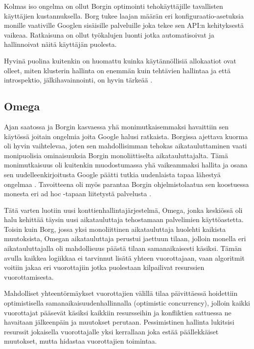 \documentclass[finnish]{tktltiki2}
\theoremstyle{definition}
\theoremstyle{remark}
\begin{document}
Kolmas iso ongelma on ollut Borgin optimointi tehokäyttäjille tavallisten käyttäjien kustannuksella. Borg tukee laajan määrän eri konfiguraatio-asetuksia monille vaativille Googlen sisäisille palveluille joka tekee sen API:n kehityksestä vaikeaa. Ratkaisuna on ollut työkalujen luonti jotka automatisoivat ja hallinnoivat näitä käyttäjän puolesta.

Hyvinä puolina kuitenkin on huomattu kuinka käytännöllisiä allokaatiot ovat olleet, miten klusterin hallinta on enemmän kuin tehtävien hallintaa ja että introspektio, jälkihavainnointi, on hyvin tärkeää \cite{management-with-borg}.

\subsection{Omega}

Ajan saatossa ja Borgin kasvaessa yhä monimutkaisemmaksi havaittiin sen käytössä joitain ongelmia joita Google halusi ratkaista. Borgissa ajettava kuorma oli hyvin vaihtelevaa, joten sen mahdollisimman tehokas aikatauluttaminen vaati monipuolisia ominaisuuksia Borgin monoliittiselta aikatauluttajalta. Tämä monimutkaisuus oli kuitenkin muodostumassa yhä vaikeammaksi hallita ja osana sen uudelleenkirjoitusta Google päätti tutkia uudenlaista tapaa lähestyä ongelmaa \cite{omega}. Tavoitteena oli myös parantaa Borgin ohjelmistolaatua sen koostuessa monesta eri ad hoc -tapaan liitetystä palvelusta \cite{borg-omega-kubernetes}.

Tätä varten luotiin uusi konttienhallintajärjestelmä, Omega, jonka keskiössä oli halu kehittää täysin uusi aikatauluttaja tehostamaan palvelimien käyttöastetta. Toisin kuin Borg, jossa yksi monoliittinen aikatauluttaja huolehti kaikista muutoksista, Omegan aikatauluttaja perustui jaettuun tilaan, jolloin monella eri aikatauluttajalla oli mahdollisuus päästä tilaan samanaikaisesti käsiksi. Tämän avulla kaikkea logiikkaa ei tarvinnut lisätä yhteen vuorottajaan, vaan algoritmit voitiin jakaa eri vuorottajiin jotka puolestaan kilpailivat resurssien vuorottamisesta.

Mahdolliset yhteentörmäykset vuorottajien välillä tilaa päivittäessä hoidettiin optimistisella samanaikaisuudenhallinnalla (optimistic concurrency), jolloin kaikki vuorottajat pääsevät käsiksi kaikkiin resursseihin ja konfliktien sattuessa ne havaitaan jälkeenpäin ja muutokset perutaan. Pessimistinen hallinta lukitsisi resurssit jokaisella vuorottajalle yksi kerrallaan joka estää päällekkäiset muutokset, mutta hidastaa vuorottajien toimintaa.
\end{document}
